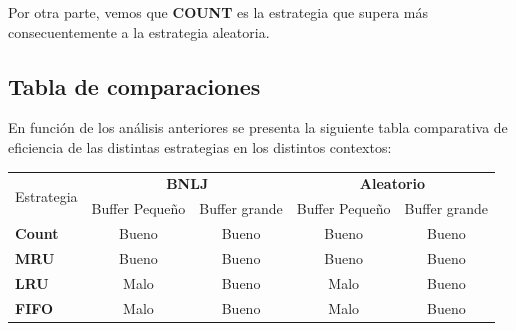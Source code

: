 Por otra parte, vemos que \textbf{COUNT} es la estrategia que supera m\'as consecuentemente a la estrategia aleatoria. 

\subsection{Tabla de comparaciones}
En funci\'on de los an\'alisis anteriores se presenta la siguiente tabla comparativa de eficiencia de las distintas estrategias en los distintos contextos:
\begin{center}
  \begin{tabular}{ | l | c | c | c | c | }
    \hline
    \multirow{2}{*}{Estrategia} & \multicolumn{2}{c|}{\textbf{BNLJ}} & \multicolumn{2}{c|}{\textbf{Aleatorio}} \\
    & Buffer Peque\~no & Buffer grande & Buffer Peque\~no & Buffer grande \\ \hline
    \textbf{Count} & Bueno & Bueno & Bueno & Bueno \\ \hline
    \textbf{MRU} & Bueno & Bueno & Bueno & Bueno \\ \hline
    \textbf{LRU} & Malo & Bueno & Malo & Bueno \\ \hline
    \textbf{FIFO} & Malo & Bueno & Malo & Bueno \\ \hline
  \end{tabular}
\end{center}